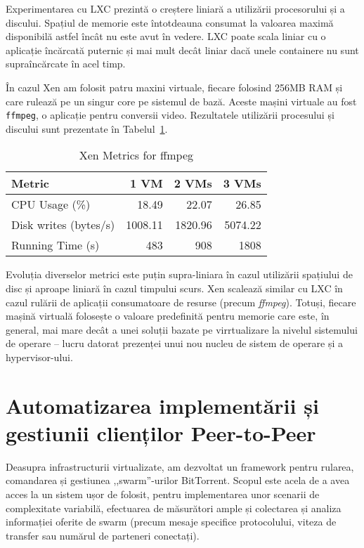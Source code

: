 Experimentarea cu LXC prezintă o creștere liniară a utilizării procesorului și
a discului. Spațiul de memorie este întotdeauna consumat la valoarea maximă
disponibilă astfel încât nu este avut în vedere. LXC poate scala liniar cu o
aplicație încărcată puternic și mai mult decât liniar dacă unele containere nu
sunt supraîncărcate în acel timp.

În cazul Xen am folosit patru maxini virtuale, fiecare folosind 256MB RAM și
care rulează pe un singur core pe sistemul de bază. Aceste mașini virtuale au
fost \texttt{ffmpeg}, o aplicație pentru conversii video. Rezultatele
utilizării procesului și discului sunt prezentate în
Tabelul~\ref{table:virt-infra:xen-metrics}.

\begin{table}[ht]
  \centering
  \begin{tabular}{@{}lrrr@{}}
    \toprule
    \textbf{Metric} & \textbf{1 VM} & \textbf{2 VMs} & \textbf{3 VMs} \\
    \midrule
    CPU Usage (\%) & 18.49 & 22.07 & 26.85 \\
    Disk writes (bytes/s) & 1008.11 & 1820.96 & 5074.22 \\
    Running Time (s) & 483 & 908 & 1808 \\
    \bottomrule
  \end{tabular}
  \caption{Xen Metrics for ffmpeg}
  \label{table:virt-infra:xen-metrics}
\end{table}

Evoluția diverselor metrici este puțin supra-liniara în cazul utilizării
spațiului de disc și aproape liniară în cazul timpului scurs. Xen scalează
similar cu LXC în cazul rulării de aplicații consumatoare de resurse (precum
\textit{ffmpeg}). Totuși, fiecare mașină virtuală folosește o valoare
predefinită pentru memorie care este, în general, mai mare decât a unei
soluții bazate pe virrtualizare la nivelul sistemului de operare -- lucru
datorat prezenței unui nou nucleu de sistem de operare și a hypervisor-ului.

\section{Automatizarea implementării și gestiunii clienților Peer-to-Peer}
\label{sec:virt-infra:auto-deploy}

Deasupra infrastructurii virtualizate, am dezvoltat un framework pentru
rularea, comandarea și gestiunea ,,swarm''-urilor BitTorrent. Scopul
este acela de a avea acces la un sistem ușor de folosit, pentru implementarea
unor scenarii de complexitate variabilă, efectuarea de măsurători ample și
colectarea și analiza informației oferite de swarm (precum mesaje specifice
protocolului, viteza de transfer sau numărul de parteneri conectați).

